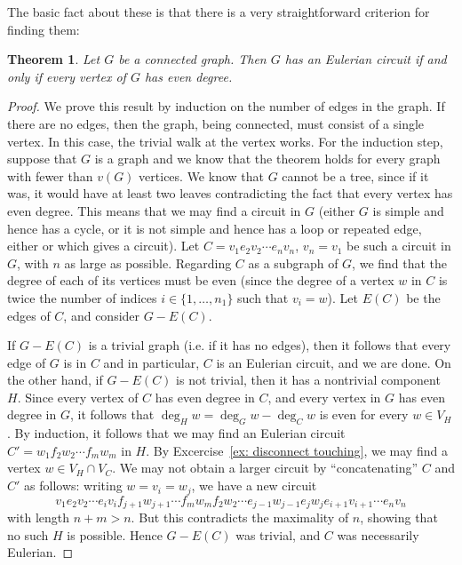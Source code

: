 \documentclass[12pt]{report}
\theoremstyle{plain}
\newtheorem{thm}{Theorem}[section]
\begin{document}
The basic fact about these is that there is a very straightforward
criterion for finding them:
\begin{thm}
Let $G$ be a connected graph. Then $G$ has an Eulerian circuit if and only
if every vertex of $G$ has even degree.
\end{thm}
\begin{proof}
We prove this result by induction on the number of edges in the graph.
If there are no edges, then the graph, being connected, must consist of a
single vertex. In this case, the trivial walk at the vertex works. For
the induction step, suppose that $G$ is a graph and we know that the
theorem holds for every graph with fewer than $v(G)$ vertices. We know that
$G$ cannot be a tree, since if it was, it would have at least two leaves
contradicting the fact that every vertex has even degree. This means that
we may find a circuit in $G$ (either $G$ is simple and hence has a cycle,
or it is not simple and hence has a loop or repeated edge, either or which
gives a circuit). Let $C = v_1 e_2 v_2 \cdots e_n v_n$, $v_n = v_1$ be such
a circuit in $G$, with $n$ as large as possible. Regarding $C$ as a
subgraph of $G$, we find that the degree of each of its vertices must be
even (since the degree of a vertex $w$ in $C$ is twice the number of
indices $i \in \{1, \ldots, n_1\}$ such that $v_i = w$). Let $E(C)$ be the
edges of $C$, and consider $G - E(C)$.

If $G - E(C)$ is a trivial graph (i.e. if it has no edges), then it follows
that every edge of $G$ is in $C$ and in particular, $C$ is an Eulerian
circuit, and we are done. On the other hand, if $G - E(C)$ is not trivial,
then it has a nontrivial component $H$. Since every vertex of $C$ has even
degree in $C$, and every vertex in $G$ has even degree in $G$, it follows
that $\deg_H w = \deg_G w - \deg_C w$ is even for every $w \in V_H$. By
induction, it follows that we may find an Eulerian circuit $C' = w_1 f_2
w_2 \cdots f_m w_m$ in $H$. By Excercise~\ref{ex: disconnect touching}, we
may find a vertex $w \in V_H \cap V_C$. We may not obtain a larger circuit
by ``concatenating'' $C$ and $C'$ as follows: writing $w = v_i = w_j$, we
have a new circuit 
\[v_1 e_2 v_2 \cdots e_i v_i f_{j+1} w_{j+1} \cdots f_m
w_m f_2 w_2 \cdots e_{j-1} w_{j-1} e_j w_j e_{i+1} v_{i+1} \cdots e_n v_n\]
with length $n + m > n$. But this contradicts the maximality of $n$,
showing that no such $H$ is possible. Hence $G - E(C)$ was trivial, and $C$
was necessarily Eulerian.
\end{proof}
\end{document}
